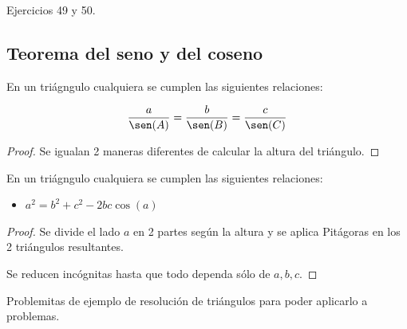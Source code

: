 Ejercicios 49 y 50.



\subsection{Teorema del seno y del coseno}

\begin{theorem}
En un triágngulo cualquiera se cumplen las siguientes relaciones:

\[\frac{a}{\sen(A)} = \frac{b}{\sen(B)} = \frac{c}{\sen(C)}\]

\end{theorem}

\begin{proof}
Se igualan 2 maneras diferentes de calcular la altura del triángulo.
\end{proof}

\begin{theorem}
En un triágngulo cualquiera se cumplen las siguientes relaciones:

\begin{itemize}
	\item $a^2 = b^2+c^2 - 2bc\cos(a)$
\end{itemize}

\end{theorem}
\begin{proof}
Se divide el lado $a$ en 2 partes según la altura y se aplica Pitágoras en los 2 triángulos resultantes. 

Se reducen incógnitas hasta que todo dependa sólo de $a,b,c$.
\end{proof}

Problemitas de ejemplo de resolución de triángulos para poder aplicarlo a problemas.

